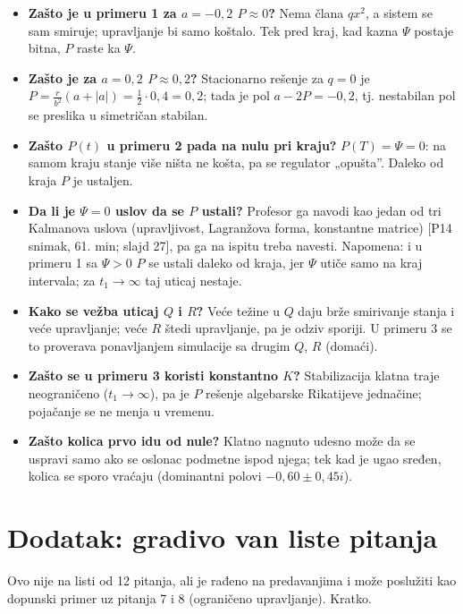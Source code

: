 \documentclass[11pt,a4paper,parskip=half,headsepline,numbers=noenddot]{scrartcl}
\DeclareRobustCommand{\izvor}[1]{{\small\color{izvorC}[#1]}}
\begin{document}
\begin{itemize}
\item \textbf{Zašto je u primeru 1 za \(a = -0{,}2\) \(P \approx 0\)?} Nema člana \(qx^2\), a sistem se sam smiruje; upravljanje bi samo koštalo. Tek pred kraj, kad kazna \(\Psi\) postaje bitna, \(P\) raste ka \(\Psi\).
\item \textbf{Zašto je za \(a = 0{,}2\) \(P \approx 0{,}2\)?} Stacionarno rešenje za \(q = 0\) je \(P = \frac{r}{b^2}(a + |a|) = \frac12\cdot0{,}4 = 0{,}2\); tada je pol \(a - 2P = -0{,}2\), tj. nestabilan pol se preslika u simetričan stabilan.
\item \textbf{Zašto \(P(t)\) u primeru 2 pada na nulu pri kraju?} \(P(T) = \Psi = 0\): na samom kraju stanje više ništa ne košta, pa se regulator „opušta''. Daleko od kraja \(P\) je ustaljen.
\item \textbf{Da li je \(\Psi = 0\) uslov da se \(P\) ustali?} Profesor ga navodi kao jedan od tri Kalmanova uslova (upravljivost, Lagranžova forma, konstantne matrice) \izvor{P14 snimak, 61. min; slajd 27}, pa ga na ispitu treba navesti. Napomena: i u primeru 1 sa \(\Psi > 0\) \(P\) se ustali daleko od kraja, jer \(\Psi\) utiče samo na kraj intervala; za \(t_1 \to \infty\) taj uticaj nestaje.
\item \textbf{Kako se vežba uticaj \(Q\) i \(R\)?} Veće težine u \(Q\) daju brže smirivanje stanja i veće upravljanje; veće \(R\) štedi upravljanje, pa je odziv sporiji. U primeru 3 se to proverava ponavljanjem simulacije sa drugim \(Q\), \(R\) (domaći).
\item \textbf{Zašto se u primeru 3 koristi konstantno \(K\)?} Stabilizacija klatna traje neograničeno (\(t_1 \to \infty\)), pa je \(P\) rešenje algebarske Rikatijeve jednačine; pojačanje se ne menja u vremenu.
\item \textbf{Zašto kolica prvo idu od nule?} Klatno nagnuto udesno može da se uspravi samo ako se oslonac podmetne ispod njega; tek kad je ugao sređen, kolica se sporo vraćaju (dominantni polovi \(-0{,}60 \pm 0{,}45i\)).
\end{itemize}

\section{Dodatak: gradivo van liste pitanja}

Ovo nije na listi od 12 pitanja, ali je rađeno na predavanjima i može poslužiti kao dopunski primer uz pitanja 7 i 8 (ograničeno upravljanje). Kratko.
\end{document}

